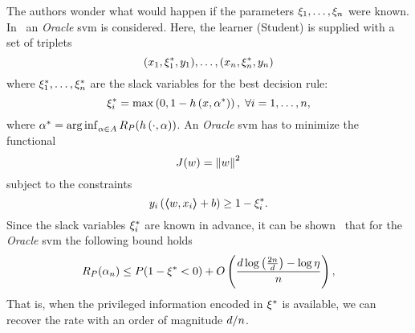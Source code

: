 The authors wonder what would happen if the parameters $\xi_1, \ldots, \xi_n$ were known.
In~\cite{VapnikI15a} an \emph{Oracle} \acrshort{svm} is considered. Here, the learner (Student) is supplied with a set of triplets
\begin{equation}
    \nonumber
    (x_1, {\xi}^*_1, y_1), \ldots, (x_n, {\xi}^*_n, y_n)
\end{equation}
where ${\xi}^*_1, \ldots, {\xi}^*_n$ are the slack variables for the best decision rule:
\begin{equation}
    \nonumber
    {\xi}^*_i = \max \left(0, 1 - h\left(x, {\alpha}^*\right)  \right), \; \forall i = 1, \ldots, n ,
\end{equation}
where ${\alpha}^* = \operatorname*{arg\inf}_{\alpha \in A} R_P(h\left(\cdot, \alpha\right)) $.
An \emph{Oracle} \acrshort{svm} has to minimize the functional
$$J(w) = \left\lVert w\right\rVert^2$$
subject to the constraints
$$y_i \left( \bm{\left\langle} w, x_i \bm{\right\rangle} + b \right) \geq 1 - {\xi}^*_i .$$
Since the slack variables ${\xi}^*_i$ are known in advance, it can be shown~\citep{VapnikV09} that for the \emph{Oracle} \acrshort{svm} the following bound holds
\begin{equation}
    \nonumber
    R_P(\alpha_n) \leq P(1 - {\xi}^* < 0) + O\left( \frac{d \log\left(\frac{2n}{d} \right) - \log\eta}{n}  \right) ,
\end{equation}
That is, when the privileged information encoded in ${\xi}^*$ is available, we can recover the rate with an order of magnitude $d/n$.

